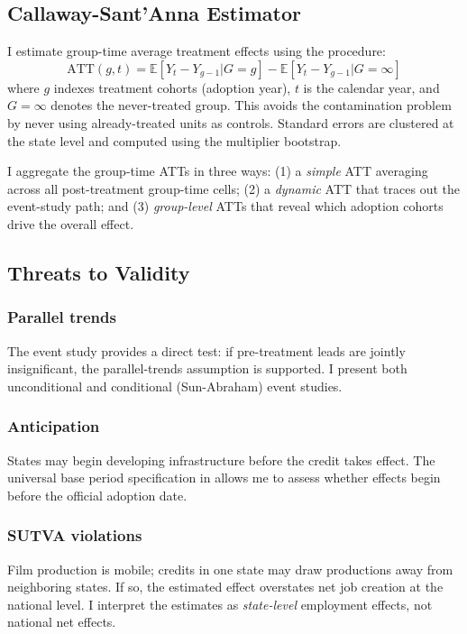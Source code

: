 \documentclass[12pt]{article}
\newcommand{\E}{\mathbb{E}}
\begin{document}
\subsection{Callaway-Sant'Anna Estimator}

I estimate group-time average treatment effects using the \citet{callaway2021difference} procedure:
\begin{equation}
\text{ATT}(g,t) = \E[Y_t - Y_{g-1} | G = g] - \E[Y_t - Y_{g-1} | G = \infty]
\end{equation}
where $g$ indexes treatment cohorts (adoption year), $t$ is the calendar year, and $G = \infty$ denotes the never-treated group. This avoids the contamination problem by never using already-treated units as controls. Standard errors are clustered at the state level and computed using the multiplier bootstrap.

I aggregate the group-time ATTs in three ways: (1) a \emph{simple} ATT averaging across all post-treatment group-time cells; (2) a \emph{dynamic} ATT that traces out the event-study path; and (3) \emph{group-level} ATTs that reveal which adoption cohorts drive the overall effect.

\subsection{Threats to Validity}

\subsubsection*{Parallel trends} The event study provides a direct test: if pre-treatment leads are jointly insignificant, the parallel-trends assumption is supported. I present both unconditional and conditional (Sun-Abraham) event studies.

\subsubsection*{Anticipation} States may begin developing infrastructure before the credit takes effect. The universal base period specification in \citet{callaway2021difference} allows me to assess whether effects begin before the official adoption date.

\subsubsection*{SUTVA violations} Film production is mobile; credits in one state may draw productions away from neighboring states. If so, the estimated effect overstates net job creation at the national level. I interpret the estimates as \emph{state-level} employment effects, not national net effects.
\end{document}
